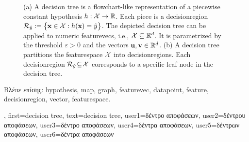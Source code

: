 {{\begin{figure}[H]
\begin{minipage}{.45\textwidth}
		\end{minipage}
		\caption{(a) A decision tree is a flowchart-like representation of a piecewise constant \gls{hypothesis} $h: \mathcal{X} \rightarrow \mathbb{R}$.  
		Each piece is a \gls{decisionregion} $\mathcal{R}_{\hat{y}} := \big\{ {\bf x} \in  \mathcal{X}: h({\bf x}) = \hat{y} \big\}$. 
		The depicted decision tree can be applied to numeric \gls{featurevec}s, i.e., $\mathcal{X} \subseteq \mathbb{R}^{d}$. It is 
		parametrized by the threshold $\varepsilon>0$ and the \gls{vector}s ${\bf u}, {\bf v} \in \mathbb{R}^{d}$. 
		(b) A decision tree partitions the \gls{featurespace} $\mathcal{X}$ into \gls{decisionregion}s. Each \gls{decisionregion}  
		$\mathcal{R}_{\hat{y}} \!\subseteq\!\mathcal{X}$ corresponds to a specific leaf node in the decision tree.}
		\label{fig_decision_tree_dict}
		\end{figure} 
		\foreignlanguage{greek}{Βλέπε επίσης:} \gls{hypothesis}, \gls{map}, \gls{graph}, \gls{featurevec}, \gls{datapoint}, \gls{feature}, \gls{decisionregion}, 
		\gls{vector}, \gls{featurespace}.},
	first={decision tree},
	text={decision tree},
	user1={\foreignlanguage{greek}{δέντρο αποφάσεων}}, %
	user2={\foreignlanguage{greek}{δέντρου αποφάσεων}}, %
	user3={\foreignlanguage{greek}{δέντρο αποφάσεων}}, %
	user4={\foreignlanguage{greek}{δέντρα αποφάσεων}}, %
	user5={\foreignlanguage{greek}{δέντρων αποφάσεων}}, %
	user6={\foreignlanguage{greek}{δέντρα αποφάσεων}} %
}

